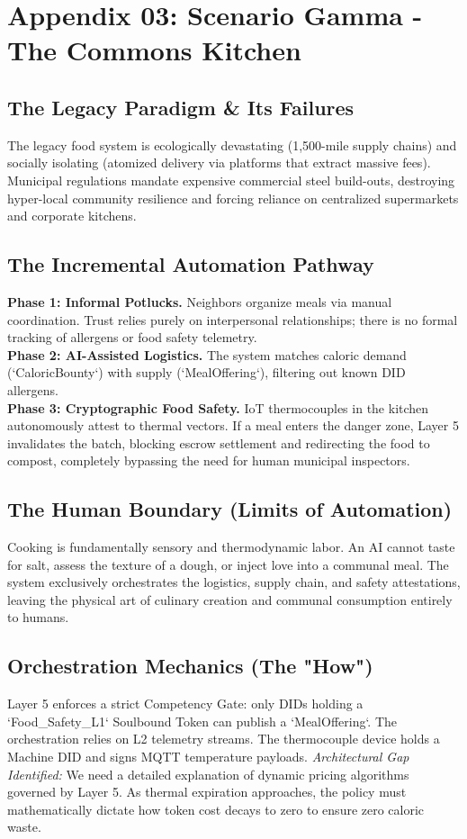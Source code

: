 \chapter{Appendix 03: Scenario Gamma - The Commons Kitchen}

\section{The Legacy Paradigm \& Its Failures}
The legacy food system is ecologically devastating (1,500-mile supply chains) and socially isolating (atomized delivery via platforms that extract massive fees). Municipal regulations mandate expensive commercial steel build-outs, destroying hyper-local community resilience and forcing reliance on centralized supermarkets and corporate kitchens.

\section{The Incremental Automation Pathway}
\textbf{Phase 1: Informal Potlucks.} Neighbors organize meals via manual coordination. Trust relies purely on interpersonal relationships; there is no formal tracking of allergens or food safety telemetry. \\
\textbf{Phase 2: AI-Assisted Logistics.} The system matches caloric demand (`CaloricBounty`) with supply (`MealOffering`), filtering out known DID allergens. \\
\textbf{Phase 3: Cryptographic Food Safety.} IoT thermocouples in the kitchen autonomously attest to thermal vectors. If a meal enters the danger zone, Layer 5 invalidates the batch, blocking escrow settlement and redirecting the food to compost, completely bypassing the need for human municipal inspectors.

\section{The Human Boundary (Limits of Automation)}
Cooking is fundamentally sensory and thermodynamic labor. An AI cannot taste for salt, assess the texture of a dough, or inject love into a communal meal. The system exclusively orchestrates the logistics, supply chain, and safety attestations, leaving the physical art of culinary creation and communal consumption entirely to humans.

\section{Orchestration Mechanics (The "How")}
Layer 5 enforces a strict Competency Gate: only DIDs holding a `Food\_Safety\_L1` Soulbound Token can publish a `MealOffering`. The orchestration relies on L2 telemetry streams. The thermocouple device holds a Machine DID and signs MQTT temperature payloads. 
\textit{Architectural Gap Identified:} We need a detailed explanation of dynamic pricing algorithms governed by Layer 5. As thermal expiration approaches, the policy must mathematically dictate how token cost decays to zero to ensure zero caloric waste.
